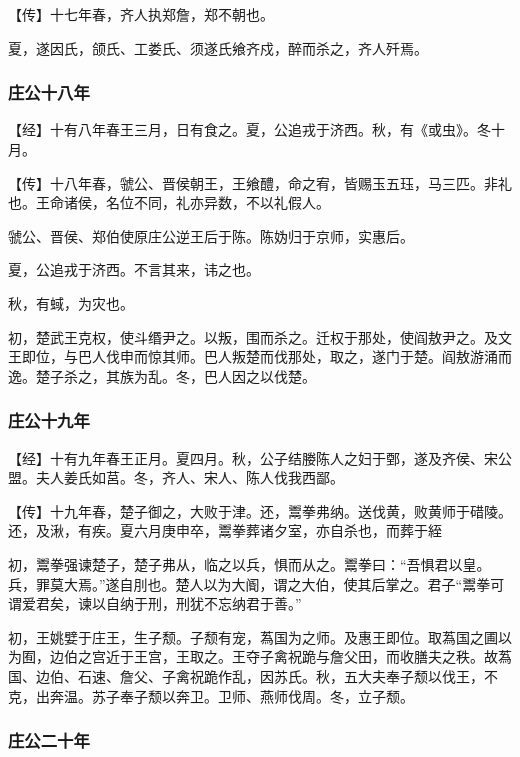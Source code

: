 \documentclass[]{article}
\begin{document}
【传】十七年春，齐人执郑詹，郑不朝也。

夏，遂因氏，颌氏、工娄氏、须遂氏飨齐戍，醉而杀之，齐人歼焉。

\hypertarget{header-n489}{%
\subsubsection{庄公十八年}\label{header-n489}}

【经】十有八年春王三月，日有食之。夏，公追戎于济西。秋，有《或虫》。冬十月。

【传】十八年春，虢公、晋侯朝王，王飨醴，命之宥，皆赐玉五珏，马三匹。非礼也。王命诸侯，名位不同，礼亦异数，不以礼假人。

虢公、晋侯、郑伯使原庄公逆王后于陈。陈妫归于京师，实惠后。

夏，公追戎于济西。不言其来，讳之也。

秋，有蜮，为灾也。

初，楚武王克权，使斗缗尹之。以叛，围而杀之。迁权于那处，使阎敖尹之。及文王即位，与巴人伐申而惊其师。巴人叛楚而伐那处，取之，遂门于楚。阎敖游涌而逸。楚子杀之，其族为乱。冬，巴人因之以伐楚。

\hypertarget{header-n498}{%
\subsubsection{庄公十九年}\label{header-n498}}

【经】十有九年春王正月。夏四月。秋，公子结媵陈人之妇于鄄，遂及齐侯、宋公盟。夫人姜氏如莒。冬，齐人、宋人、陈人伐我西鄙。

【传】十九年春，楚子御之，大败于津。还，鬻拳弗纳。送伐黄，败黄师于碏陵。还，及湫，有疾。夏六月庚申卒，鬻拳葬诸夕室，亦自杀也，而葬于絰

初，鬻拳强谏楚子，楚子弗从，临之以兵，惧而从之。鬻拳曰：``吾惧君以皇。兵，罪莫大焉。''遂自刖也。楚人以为大阍，谓之大伯，使其后掌之。君子``鬻拳可谓爱君矣，谏以自纳于刑，刑犹不忘纳君于善。''

初，王姚嬖于庄王，生子颓。子颓有宠，蒍国为之师。及惠王即位。取蒍国之圃以为囿，边伯之宫近于王宫，王取之。王夺子禽祝跪与詹父田，而收膳夫之秩。故蒍国、边伯、石速、詹父、子禽祝跪作乱，因苏氏。秋，五大夫奉子颓以伐王，不克，出奔温。苏子奉子颓以奔卫。卫师、燕师伐周。冬，立子颓。

\hypertarget{header-n505}{%
\subsubsection{庄公二十年}\label{header-n505}}
\end{document}
